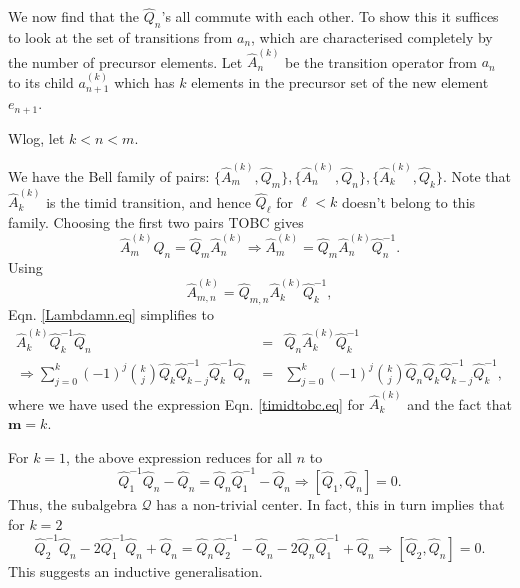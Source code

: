 \documentclass[11pt]{article}
\newcommand{\hA}{\hat { A}}
\newcommand{\hQ}{\hat Q}
\newcommand{\achain}{a}
\newcommand{\bmm}{{\mathbf m}}
\newcommand{\cQ}{\mathcal Q}
\begin{document}
We now find that the $\hQ_n$'s all commute with each other.  To show this it suffices
to look at the set of transitions from  $\achain_n$, which are 
characterised completely by the number of precursor elements. Let
$\hA_n^{(k)}$ be the transition operator from $\achain_n$ to its child
$\achain^{(k)}_{n+1}$ which has $k$ elements in the precursor set of
the new element $e_{n+1}$.  

Wlog, let $k< n < m$.

We have the Bell family of pairs: $\{\hA_m^{(k)}, \hQ_m \}, \{\hA_n^{(k)},
\hQ_n \}, \{\hA_k^{(k)}, \hQ_k \}$.  Note that $\hA_k^{(k)}$ is the
timid transition, and hence $\hQ_\ell$ for $\ell < k$ doesn't belong
to this family. Choosing the first two pairs TOBC gives 
\begin{equation}
\hA_m^{(k)} \hQ_n =  \hQ_m \hA_n^{(k)} \Rightarrow  \hA_m^{(k)} =
\hQ_m \hA_n^{(k)} \hQ_n^{-1}.  \label{Lambdamn.eq} 
  \end{equation} 
  Using
  \begin{equation}
\hA_{m,n}^{(k)} =
\hQ_{m,n} \hA_k^{(k)} \hQ_k^{-1}, 
    \end{equation} 
    Eqn. \eqref{Lambdamn.eq} simplifies to
\begin{eqnarray} 
  \hA_k^{(k)} \hQ_k^{-1} \hQ_n &= &  \hQ_n \hA_k^{(k)} \hQ_k^{-1}
                                    \nonumber \\
  \Rightarrow \sum_{j=0}^k (-1)^j \binom{k}{j} \hQ_k \hQ_{k-j}^{-1} \hQ_k^{-1}
  \hQ_n &=&  \sum_{j=0}^k (-1)^j \binom{k}{j} \hQ_n \hQ_k
            \hQ_{k-j}^{-1} \hQ_k^{-1}, \label{qnqk.eq} 
  \end{eqnarray} 
where we have used the expression Eqn. \ref{timidtobc.eq} for $\hA_k^{(k)}$ and
the fact that $\bmm=k$.    

For $k=1$, the above expression reduces for all $n$ to
\begin{equation}
\hQ_1^{-1} \hQ_n - \hQ_n = \hQ_n \hQ_1^{-1} -\hQ_n  \Rightarrow
[\hQ_1, \hQ_n]=0.  \label{qoneqn.eq} 
\end{equation}
Thus, the subalgebra $\cQ$ has a non-trivial center. In fact, this in
turn 
implies that  for $k=2$ 
\begin{equation}
\hQ_2^{-1} \hQ_n - 2\hQ_1^{-1} \hQ_n + \hQ_n = \hQ_n \hQ_2^{-1} -\hQ_n
- 2 \hQ_n \hQ_1^{-1} + \hQ_n\Rightarrow
[\hQ_2, \hQ_n]=0. 
\end{equation}
This suggests an inductive generalisation.  
\end{document}
